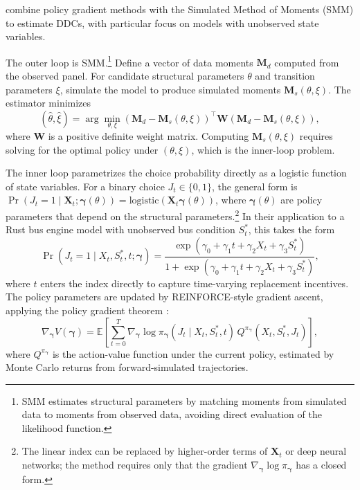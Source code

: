 \citet{HuYang2025} combine policy gradient methods with the Simulated Method of Moments (SMM) to estimate DDCs, with particular focus on models with unobserved state variables.

The outer loop is SMM.\footnote{SMM \citep{GourierouxMonfort1993} estimates structural parameters by matching moments from simulated data to moments from observed data, avoiding direct evaluation of the likelihood function.} Define a vector of data moments $\mathbf{M}_d$ computed from the observed panel. For candidate structural parameters $\theta$ and transition parameters $\xi$, simulate the model to produce simulated moments $\mathbf{M}_s(\theta, \xi)$. The estimator minimizes
\begin{equation}
(\hat{\theta}, \hat{\xi}) = \arg\min_{\theta, \xi} \left(\mathbf{M}_d - \mathbf{M}_s(\theta, \xi)\right)^\top \mathbf{W} \left(\mathbf{M}_d - \mathbf{M}_s(\theta, \xi)\right), \label{eq:hy_outer}
\end{equation}
where $\mathbf{W}$ is a positive definite weight matrix. Computing $\mathbf{M}_s(\theta, \xi)$ requires solving for the optimal policy under $(\theta, \xi)$, which is the inner-loop problem.

The inner loop parametrizes the choice probability directly as a logistic function of state variables. For a binary choice $J_t \in \{0, 1\}$, the general form is $\Pr(J_t = 1 \mid \boldsymbol{X}_t; \boldsymbol{\gamma}(\theta)) = \text{logistic}(\boldsymbol{X}_t \boldsymbol{\gamma}(\theta))$, where $\boldsymbol{\gamma}(\theta)$ are policy parameters that depend on the structural parameters.\footnote{The linear index can be replaced by higher-order terms of $\boldsymbol{X}_t$ or deep neural networks; the method requires only that the gradient $\nabla_{\boldsymbol{\gamma}} \log \pi_{\boldsymbol{\gamma}}$ has a closed form.} In their application to a Rust bus engine model with unobserved bus condition $S_t^*$, this takes the form
\begin{equation}
\Pr(J_t = 1 \mid X_t, S_t^*, t; \boldsymbol{\gamma}) = \frac{\exp(\gamma_0 + \gamma_1 t + \gamma_2 X_t + \gamma_3 S_t^*)}{1 + \exp(\gamma_0 + \gamma_1 t + \gamma_2 X_t + \gamma_3 S_t^*)}, \label{eq:hy_policy}
\end{equation}
where $t$ enters the index directly to capture time-varying replacement incentives. The policy parameters are updated by REINFORCE-style gradient ascent, applying the policy gradient theorem \citep{Sutton1999}:
\begin{equation}
\nabla_{\boldsymbol{\gamma}} V(\boldsymbol{\gamma}) = \mathbb{E}\left[\sum_{t=0}^{T} \nabla_{\boldsymbol{\gamma}} \log \pi_{\boldsymbol{\gamma}}(J_t \mid X_t, S_t^*, t) \, Q^{\pi_{\boldsymbol{\gamma}}}(X_t, S_t^*, J_t)\right], \label{eq:hy_pg}
\end{equation}
where $Q^{\pi_{\boldsymbol{\gamma}}}$ is the action-value function under the current policy, estimated by Monte Carlo returns from forward-simulated trajectories.

